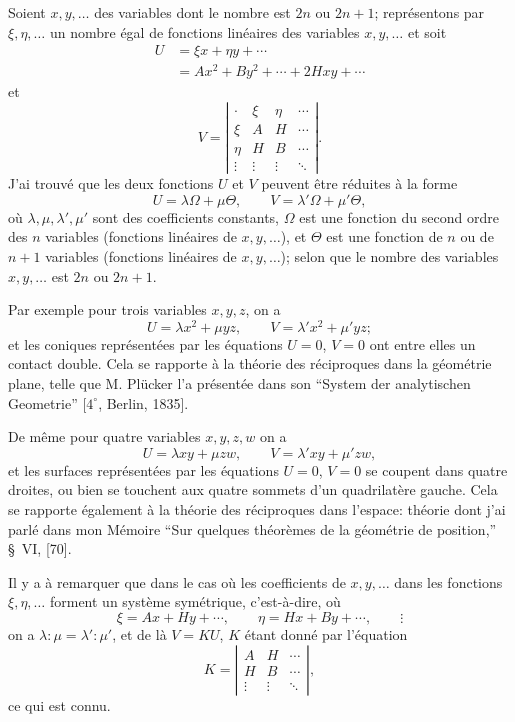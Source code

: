 \documentclass[10pt]{article}
\newcommand{\qedpage}{\vfill\pagebreak}
\begin{document}
Soient $x,y,\ldots$ des variables dont le nombre est $2n$ ou $2n+1$; repr\'esentons
par $\xi,\eta,\ldots$ un nombre \'egal de fonctions lin\'eaires des variables
$x,y,\ldots$ et soit
\[
\begin{aligned}
U&=\xi x+\eta y+\cdots\\
 &=Ax^2+By^2+\cdots+2Hxy+\cdots
\end{aligned}
\]
et
\[
V=\left|
\begin{array}{cccc}
\cdot & \xi & \eta & \cdots\\
\xi & A & H & \cdots\\
\eta & H & B & \cdots\\
\vdots & \vdots & \vdots & \ddots
\end{array}
\right|.
\]
J'ai trouv\'e que les deux fonctions $U$ et $V$ peuvent \^etre r\'eduites \`a la forme
\[
U=\lambda\Omega+\mu\Theta,\qquad
V=\lambda'\Omega+\mu'\Theta,
\]
o\`u $\lambda,\mu,\lambda',\mu'$ sont des coefficients constants, $\Omega$ est une
fonction du second ordre des $n$ variables (fonctions lin\'eaires de $x,y,\ldots$), et
$\Theta$ est une fonction de $n$ ou de $n+1$ variables (fonctions lin\'eaires de
$x,y,\ldots$); selon que le nombre des variables $x,y,\ldots$ est $2n$ ou $2n+1$.

Par exemple pour trois variables $x,y,z$, on a
\[
U=\lambda x^2+\mu yz,\qquad
V=\lambda'x^2+\mu'yz;
\]
et les coniques repr\'esent\'ees par les \'equations $U=0$, $V=0$ ont entre elles un
contact double. Cela se rapporte \`a la th\'eorie des r\'eciproques dans la g\'eom\'etrie
plane, telle que M. Pl\"ucker l'a pr\'esent\'ee dans son ``System der analytischen
Geometrie'' [$4^\circ$, Berlin, 1835].
\qedpage

De m\^eme pour quatre variables $x,y,z,w$ on a
\[
U=\lambda xy+\mu zw,\qquad
V=\lambda'xy+\mu'zw,
\]
et les surfaces repr\'esent\'ees par les \'equations $U=0$, $V=0$ se coupent dans
quatre droites, ou bien se touchent aux quatre sommets d'un quadrilat\`ere gauche.
Cela se rapporte \'egalement \`a la th\'eorie des r\'eciproques dans l'espace: th\'eorie
dont j'ai parl\'e dans mon M\'emoire ``Sur quelques th\'eor\`emes de la g\'eom\'etrie de
position,'' \S~VI, [70].

Il y a \`a remarquer que dans le cas o\`u les coefficients de $x,y,\ldots$ dans les
fonctions $\xi,\eta,\ldots$ forment un syst\`eme sym\'etrique, c'est-\`a-dire, o\`u
\[
\xi=Ax+Hy+\cdots,\qquad
\eta=Hx+By+\cdots,\qquad \vdots
\]
on a $\lambda:\mu=\lambda':\mu'$, et de l\`a $V=KU$, $K$ \'etant donn\'e par
l'\'equation
\[
K=\left|
\begin{array}{ccc}
A & H & \cdots\\
H & B & \cdots\\
\vdots & \vdots & \ddots
\end{array}
\right|,
\]
ce qui est connu.
\end{document}
